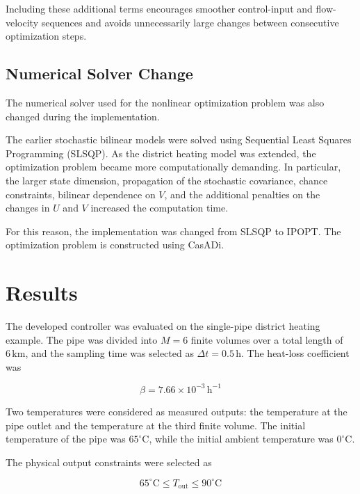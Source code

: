 Including these additional terms encourages smoother control-input and
flow-velocity sequences and avoids unnecessarily large changes between
consecutive optimization steps.


\subsection{Numerical Solver Change}

The numerical solver used for the nonlinear optimization problem was also
changed during the implementation.

The earlier stochastic bilinear models were solved using Sequential Least
Squares Programming (SLSQP). As the district heating model was extended,
the optimization problem became more computationally demanding. In
particular, the larger state dimension, propagation of the stochastic
covariance, chance constraints, bilinear dependence on \(V\), and the
additional penalties on the changes in \(U\) and \(V\) increased the
computation time.

For this reason, the implementation was changed from SLSQP to IPOPT. The
optimization problem is constructed using CasADi.

\section{Results}
\label{sec:district_heating_results}

The developed controller was evaluated on the single-pipe district heating
example. The pipe was divided into \(M=6\) finite volumes over a total length
of \(6\,\mathrm{km}\), and the sampling time was selected as
\(\Delta t=0.5\,\mathrm{h}\). The heat-loss coefficient was

\begin{equation}
    \beta = 7.66\times10^{-3}\,\mathrm{h}^{-1}
\end{equation}

Two temperatures were considered as measured outputs: the temperature at the
pipe outlet and the temperature at the third finite volume. The initial
temperature of the pipe was \(65^\circ\mathrm{C}\), while the initial ambient
temperature was \(0^\circ\mathrm{C}\).

The physical output constraints were selected as

\begin{equation}
    65^\circ\mathrm{C}
    \leq
    T_{\mathrm{out}}
    \leq
    90^\circ\mathrm{C}
\end{equation}

